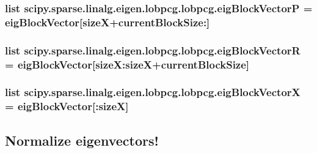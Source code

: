 \subsubsection[{eig\+Block\+Vector\+P}]{\setlength{\rightskip}{0pt plus 5cm}list scipy.\+sparse.\+linalg.\+eigen.\+lobpcg.\+lobpcg.\+eig\+Block\+Vector\+P = eig\+Block\+Vector\mbox{[}size\+X+current\+Block\+Size\+:\mbox{]}}\label{namespacescipy_1_1sparse_1_1linalg_1_1eigen_1_1lobpcg_1_1lobpcg_a1bcbfc8b9d54d16b70d9f20eb58ae9d9}
\hypertarget{namespacescipy_1_1sparse_1_1linalg_1_1eigen_1_1lobpcg_1_1lobpcg_ac8795baf14a0d28960429f9f9938558b}{}
\subsubsection[{eig\+Block\+Vector\+R}]{\setlength{\rightskip}{0pt plus 5cm}list scipy.\+sparse.\+linalg.\+eigen.\+lobpcg.\+lobpcg.\+eig\+Block\+Vector\+R = eig\+Block\+Vector\mbox{[}size\+X\+:size\+X+current\+Block\+Size\mbox{]}}\label{namespacescipy_1_1sparse_1_1linalg_1_1eigen_1_1lobpcg_1_1lobpcg_ac8795baf14a0d28960429f9f9938558b}
\hypertarget{namespacescipy_1_1sparse_1_1linalg_1_1eigen_1_1lobpcg_1_1lobpcg_adfc3268862aad3537c08b6ce4c2385a8}{}
\subsubsection[{eig\+Block\+Vector\+X}]{\setlength{\rightskip}{0pt plus 5cm}list scipy.\+sparse.\+linalg.\+eigen.\+lobpcg.\+lobpcg.\+eig\+Block\+Vector\+X = eig\+Block\+Vector\mbox{[}\+:size\+X\mbox{]}}\label{namespacescipy_1_1sparse_1_1linalg_1_1eigen_1_1lobpcg_1_1lobpcg_adfc3268862aad3537c08b6ce4c2385a8}


\subsection*{Normalize eigenvectors!}

